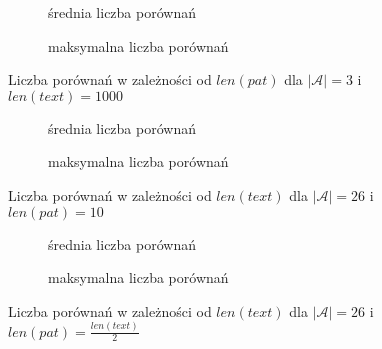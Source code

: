\begin{figure}[htb]
    \centering
    \begin{subfigure}[b]{0.49\textwidth}
        \centering
        
        \caption{średnia liczba porównań}
        \label{fig:result_alph_uni_3_text_1000_plot_avg_100}
    \end{subfigure}
    \hfill
    \begin{subfigure}[b]{0.49\textwidth}
        \centering
        
        \caption{maksymalna liczba porównań}
        \label{fig:result_alph_uni_3_text_1000_plot_max_100}
    \end{subfigure}
    \hfill
    \caption{Liczba porównań w zależności od $len(pat)$ dla $|\mathcal{A}| = 3$ i $len(text) = 1000$}
    \label{fig:result_alph_uni_3_text_1000}
\end{figure}

\begin{figure}[htb]
    \centering
    \begin{subfigure}[b]{0.49\textwidth}
        \centering
        
        \caption{średnia liczba porównań}
        \label{fig:result_alph_uni_26_pat_10_plot_avg_100}
    \end{subfigure}
    \hfill
    \begin{subfigure}[b]{0.49\textwidth}
        \centering
        
        \caption{maksymalna liczba porównań}
        \label{fig:result_alph_uni_26_pat_10_plot_max_100}
    \end{subfigure}
    \hfill
    \caption{Liczba porównań w zależności od $len(text)$ dla $|\mathcal{A}| = 26$ i $len(pat) = 10$}
    \label{fig:result_alph_uni_26_pat_10}
\end{figure}

\begin{figure}[htb]
    \centering
    \begin{subfigure}[b]{0.49\textwidth}
        \centering
        
        \caption{średnia liczba porównań}
        \label{fig:result_alph_uni_26_pat_len(text)2_plot_avg_100}
    \end{subfigure}
    \hfill
    \begin{subfigure}[b]{0.49\textwidth}
        \centering
        
        \caption{maksymalna liczba porównań}
        \label{fig:result_alph_uni_26_pat_len(text)2_plot_max_100}
    \end{subfigure}
    \hfill
    \caption{Liczba porównań w zależności od $len(text)$ dla $|\mathcal{A}| = 26$ i $len(pat) = \frac{len(text)}{2}$}
    \label{fig:result_alph_uni_26_pat_len(text)2}
\end{figure}

